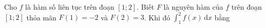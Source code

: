 \begin{ex}
Cho $f$ là hàm số liên tục trên đoạn $[1;2]$. Biết $F$ là nguyên hàm của $f$ trên đoạn $[1;2]$ thỏa mãn $F(1)=-2$ và $F(2)=3$. Khi đó $\displaystyle\int_1^2f(x)\,\mathrm dx$ bằng
\end{ex}
